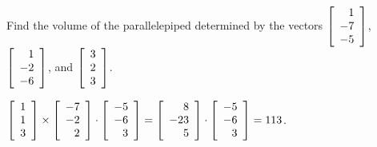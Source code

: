 \documentclass{ximera}
\begin{document}
  \begin{example}
    Find the volume of the parallelepiped determined by the vectors
    $\startmat{r}
      1 \\
      -7 \\
      -5
    \stopmat$,
    $\startmat{r}
      1 \\
      -2 \\
      -6
    \stopmat$, and $\startmat{r}
      3 \\
      2 \\
      3
    \stopmat$.
    \begin{solution}
      $\startmat{r}1\\1\\3\stopmat
        \times \startmat{r}-7\\-2\\2\stopmat 
      \cdot \startmat{r}-5\\-6\\3\stopmat =
      \startmat{r}8\\-23\\5\stopmat
      \cdot \startmat{r}-5\\-6\\3\stopmat =
      113$.
    \end{solution}
  \end{example}
\end{document}
